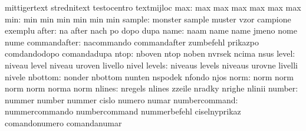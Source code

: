                            mittigertext              strednitext
                           testocentro               textmijloc %
                      max: max                       max
                           max                       max
                           max                       max
                      min: min                       min
                           min                       min
                           min                       min
                   sample: monster                   sample
                           muster                    vzor
                           campione                  exemplu
                    after: na                        after
                           nach                      po
                           dopo                      dupa
                     name: naam                      name
                           name                      jmeno
                           nome                      nume
             commandafter: nacommando                commandafter
                           zumbefehl                 prikazpo
                           comdandodopo              comandadupa
                     ntop: nboven                    ntop
                           noben                     nvrsek
                           ncima                     nsus
                    level: niveau                    level
                           niveau                    uroven
                           livello                   nivel
                   levels: niveaus                   levels
                           niveaus                   urovne
                           livelli                   nivele
                  nbottom: nonder                    nbottom
                           nunten                    nspodek
                           nfondo                    njos
                     norm: norm                      norm
                           norm                      norm
                           norma                     norm
                   nlines: nregels                   nlines
                           zzeile                    nradky
                           nrighe                    nlinii
                   number: nummer                    number
                           nummer                    cislo
                           numero                    numar
            numbercommand: nummercommando            numbercommand
                           nummerbefehl              ciselnyprikaz
                           comandonumero             comandanumar
